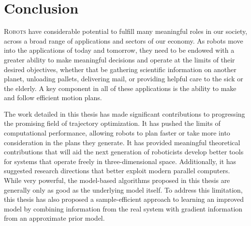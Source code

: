 \documentclass[../root.tex]{subfiles}
\begin{document}
\chapter{Conclusion} \label{chap:conclusion}
\lettrine{R}{obots} have considerable potential to fulfill many meaningful roles 
in our society, across a broad range of applications and sectors of 
our economy. As robots move into the applications of today and tomorrow,
they need to be endowed with a greater ability to make meaningful 
decisions and operate at the limits of their desired objectives, 
whether that be gathering scientific information on another planet,
unloading pallets, delivering mail, or providing helpful care to 
the sick or the elderly. A key component in all of these applications 
is the ability to make and follow efficient motion plans.

The work detailed in this thesis has made significant contributions to
progressing the promising field of trajectory optimization. It has pushed the
limits of computational performance, allowing robots to plan faster or take
more into consideration in the plans they generate. It has provided
meaningful theoretical contributions that will aid the next generation of
roboticists develop better tools for systems that operate freely in
three-dimensional space. Additionally, it has suggested research directions
that better exploit modern parallel computers. While very powerful, the 
model-based algorithms proposed in this thesis are generally only as good 
as the underlying model itself. To address this limitation, this thesis
has also proposed a sample-efficient approach to learning an improved model by 
combining information from the real system with gradient information from an 
approximate prior model.
\end{document}
